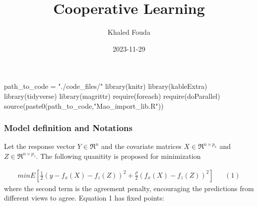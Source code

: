 \documentclass[
]{article}
\title{Cooperative Learning}
\author{Khaled Fouda}
\date{2023-11-29}
\newenvironment{Shaded}{\begin{snugshade}}{\end{snugshade}}
\newcommand{\AttributeTok}[1]{\textcolor[rgb]{0.77,0.63,0.00}{#1}}
\newcommand{\ConstantTok}[1]{\textcolor[rgb]{0.00,0.00,0.00}{#1}}
\newcommand{\FunctionTok}[1]{\textcolor[rgb]{0.00,0.00,0.00}{#1}}
\newcommand{\NormalTok}[1]{#1}
\newcommand{\OtherTok}[1]{\textcolor[rgb]{0.56,0.35,0.01}{#1}}
\newcommand{\SpecialCharTok}[1]{\textcolor[rgb]{0.00,0.00,0.00}{#1}}
\newcommand{\StringTok}[1]{\textcolor[rgb]{0.31,0.60,0.02}{#1}}
\begin{document}
\maketitle

\begin{Shaded}
\end{Shaded}

\begin{Shaded}
\begin{Highlighting}[]
\NormalTok{path\_to\_code }\OtherTok{=} \StringTok{"./code\_files/"}
\FunctionTok{library}\NormalTok{(knitr)}
\FunctionTok{library}\NormalTok{(kableExtra)}
\FunctionTok{library}\NormalTok{(tidyverse)}
\FunctionTok{library}\NormalTok{(magrittr)}
\FunctionTok{require}\NormalTok{(foreach)}
\FunctionTok{require}\NormalTok{(doParallel)}
\FunctionTok{source}\NormalTok{(}\FunctionTok{paste0}\NormalTok{(path\_to\_code,}\StringTok{"Mao\_import\_lib.R"}\NormalTok{))}
\end{Highlighting}
\end{Shaded}

\hypertarget{model-definition-and-notations}{%
\subsubsection{Model definition and
Notations}\label{model-definition-and-notations}}

Let the response vector \(Y \in \Re^n\) and the covariate matrices
\(X \in \Re^{n\times p_x}\) and \(Z \in \Re^{n \times p_z}\). The
following quanitity is proposed for minimization

\[
\begin{aligned}
min E[\frac{1}{2}(y - f_x(X)-f_z(Z))^2+\frac{\rho}{2}(f_x(X)-f_z(Z))^2]&&(1)
\end{aligned}
\] where the second term is the agreement penalty, encouraging the
predictions from different views to agree. Equation 1 has fixed points:
\end{document}

